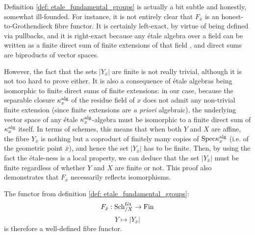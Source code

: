         \begin{remark}
            Definition \ref{def: etale_fundamental_groups} is actually a bit subtle and honestly, somewhat ill-founded. For instance, it is not entirely clear that $F_{\bar{x}}$ is an honest-to-Grothendieck fibre functor. It is certainly left-exact, by virtue of being defined via pullbacks, and it is right-exact because any \'etale algebra over a field can be written as a finite direct sum of finite extensions of that field \cite[\href{https://stacks.math.columbia.edu/tag/00U3}{Tag 00U3}]{stacks}, and direct sums are biproducts of vector spaces. 
            
            However, the fact that the sets $|Y_{\bar{x}}|$ are finite is not really trivial, although it is not too hard to prove either. It is also a consequence of \'etale algebras being isomorphic to finite direct sums of finite extensions: in our case, because the separable closure $\kappa_x^{\mathrm{alg}}$ of the residue field of $x$ does not admit any non-trivial finite extension (since finite extensions are \textit{a priori} algebraic), the underlying vector space of any \'etale $\kappa_x^{\mathrm{alg}}$-algebra must be isomorphic to a finite direct sum of $\kappa_x^{\mathrm{alg}}$ itself. In terms of schemes, this means that when both $Y$ and $X$ are affine, the fibre $Y_{\bar{x}}$ is nothing but a coproduct of finitely many copies of $\mathrm{Spec} \kappa_x^{\mathrm{alg}}$ (i.e. of the geometric point $\bar{x}$), and hence the set $|Y_{\bar{x}}|$ has to be finite. Then, by using the fact the \'etale-ness is a local property, we can deduce that the set $|Y_{\bar{x}}|$ must be finite regardless of whether $Y$ and $X$ are finite or not. This proof also demonstrates that $F_{\bar{x}}$ necessarily reflects isomorphisms.
            
            The functor from definition \ref{def: etale_fundamental_groups}:
                $$F_{\bar{x}}: \mathrm{Sch}_{/X}^{\mathrm{f\acute{e}t}} \to \mathrm{Fin}$$
                $$Y \mapsto |Y_{\bar{x}}|$$
            is therefore a well-defined fibre functor.
        \end{remark}
        
